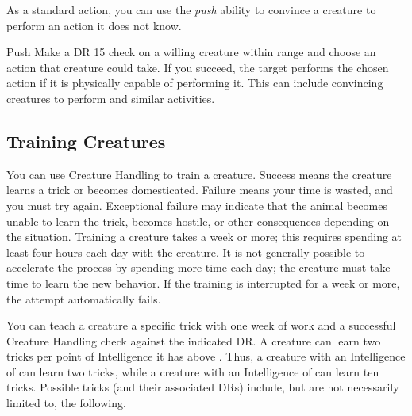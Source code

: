         As a standard action, you can use the \textit{push} ability to convince a creature to perform an action it does not know.

        \begin{ability}{Push}
            Make a DR 15 check on a willing creature within \rnglong range and choose an action that creature could take.
            If you succeed, the target performs the chosen action if it is physically capable of performing it.
            This can include convincing creatures to perform  and similar activities.
        \end{ability}

    \subsection{Training Creatures}\label{Training Creatures}
        You can use Creature Handling to train a creature. Success means the creature learns a trick or becomes domesticated. Failure means your time is wasted, and you must try again. Exceptional failure may indicate that the animal becomes unable to learn the trick, becomes hostile, or other consequences depending on the situation. Training a creature takes a week or more; this requires spending at least four hours each day with the creature. It is not generally possible to accelerate the process by spending more time each day; the creature must take time to learn the new behavior. If the training is interrupted for a week or more, the attempt automatically fails.

         You can teach a creature a specific trick with one week of work and a successful Creature Handling check against the indicated DR\@. A creature can learn two tricks per point of Intelligence it has above . Thus, a creature with an Intelligence of  can learn two tricks, while a creature with an Intelligence of  can learn ten tricks. Possible tricks (and their associated DRs) include, but are not necessarily limited to, the following.

